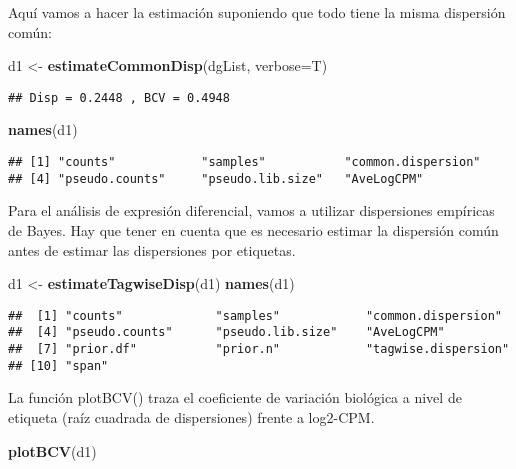 \documentclass[
]{article}
\newenvironment{Shaded}{\begin{snugshade}}{\end{snugshade}}
\newcommand{\DataTypeTok}[1]{\textcolor[rgb]{0.13,0.29,0.53}{#1}}
\newcommand{\KeywordTok}[1]{\textcolor[rgb]{0.13,0.29,0.53}{\textbf{#1}}}
\newcommand{\NormalTok}[1]{#1}
\newcommand{\StringTok}[1]{\textcolor[rgb]{0.31,0.60,0.02}{#1}}
\begin{document}
Aquí vamos a hacer la estimación suponiendo que todo tiene la misma
dispersión común:

\begin{Shaded}
\begin{Highlighting}[]
\NormalTok{d1 <-}\StringTok{ }\KeywordTok{estimateCommonDisp}\NormalTok{(dgList, }\DataTypeTok{verbose=}\NormalTok{T)}
\end{Highlighting}
\end{Shaded}

\begin{verbatim}
## Disp = 0.2448 , BCV = 0.4948
\end{verbatim}

\begin{Shaded}
\begin{Highlighting}[]
\KeywordTok{names}\NormalTok{(d1)}
\end{Highlighting}
\end{Shaded}

\begin{verbatim}
## [1] "counts"            "samples"           "common.dispersion"
## [4] "pseudo.counts"     "pseudo.lib.size"   "AveLogCPM"
\end{verbatim}

Para el análisis de expresión diferencial, vamos a utilizar dispersiones
empíricas de Bayes. Hay que tener en cuenta que es necesario estimar la
dispersión común antes de estimar las dispersiones por etiquetas.

\begin{Shaded}
\begin{Highlighting}[]
\NormalTok{d1 <-}\StringTok{ }\KeywordTok{estimateTagwiseDisp}\NormalTok{(d1)}
\KeywordTok{names}\NormalTok{(d1)}
\end{Highlighting}
\end{Shaded}

\begin{verbatim}
##  [1] "counts"             "samples"            "common.dispersion" 
##  [4] "pseudo.counts"      "pseudo.lib.size"    "AveLogCPM"         
##  [7] "prior.df"           "prior.n"            "tagwise.dispersion"
## [10] "span"
\end{verbatim}

La función plotBCV() traza el coeficiente de variación biológica a nivel
de etiqueta (raíz cuadrada de dispersiones) frente a log2-CPM.

\begin{Shaded}
\begin{Highlighting}[]
\KeywordTok{plotBCV}\NormalTok{(d1)}
\end{Highlighting}
\end{Shaded}
\end{document}
